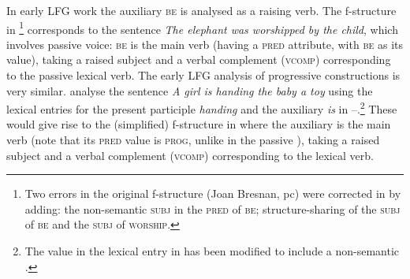 \documentclass[output=paper]{../langscibook}
\begin{document}
In early LFG work \citep{bresnan1982the-passive,kaplanbresnan82} the auxiliary \textsc{be} is analysed as a
raising verb. The f-structure in \footnote{Two
  errors in the original f-structure (Joan Bresnan, pc) were corrected in
   by adding: the non-semantic \textsc{subj} in
  the \textsc{pred} of \textsc{be}; structure-sharing of the
  \textsc{subj} of \textsc{be} and the \textsc{subj} of
  \textsc{worship}.} corresponds to the sentence \emph{The
  elephant was worshipped by the child}, which involves passive voice:
\textsc{be} is the main verb (having a \textsc{pred} attribute, with
\textsc{be} as its value), taking a raised subject and a verbal complement
(\textsc{vcomp}) corresponding to the passive lexical verb.
The early LFG analysis of progressive constructions is very
similar. \citet{kaplanbresnan82} analyse the sentence
\emph{A girl is handing the baby a toy} using the
lexical entries for the present participle \emph{handing} and the
auxiliary \emph{is} in –.\footnote{The \PRED value in the lexical entry in  has been modified to include a non-semantic \SUBJ.}
These would give rise to the (simplified) f-structure in
 where the auxiliary is the main verb
(note that its \textsc{pred} value is \textsc{prog},
unlike in the passive ), taking a raised subject and a verbal complement
(\textsc{vcomp}) corresponding to the lexical verb.
\ea\label{ex:kaplanbresnan82:65}
\\ \hspace*{\fill} \citep[(65)]{kaplanbresnan82}
\end{document}
